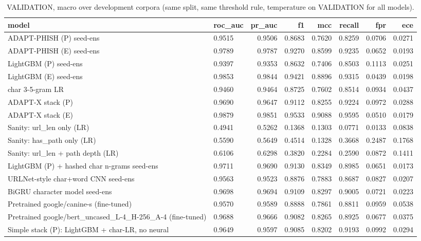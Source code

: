 \begin{table}[t]
\centering
\scriptsize
\caption{VALIDATION, macro over development corpora (same split, same threshold rule, temperature on VALIDATION for all models).}
\label{tab:baselines}
\begin{tabular}{llrrrrrr}
\toprule
model & roc\_auc & pr\_auc & f1 & mcc & recall & fpr & ece \\
\midrule
ADAPT-PHISH (P) seed-ens & 0.9515 & 0.9506 & 0.8683 & 0.7620 & 0.8259 & 0.0706 & 0.0271 \\
ADAPT-PHISH (E) seed-ens & 0.9789 & 0.9787 & 0.9270 & 0.8599 & 0.9235 & 0.0652 & 0.0193 \\
LightGBM (P) seed-ens & 0.9397 & 0.9353 & 0.8632 & 0.7406 & 0.8503 & 0.1113 & 0.0251 \\
LightGBM (E) seed-ens & 0.9853 & 0.9844 & 0.9421 & 0.8896 & 0.9315 & 0.0439 & 0.0198 \\
char 3-5-gram LR & 0.9460 & 0.9464 & 0.8725 & 0.7602 & 0.8514 & 0.0934 & 0.0437 \\
ADAPT-X stack (P) & 0.9690 & 0.9647 & 0.9112 & 0.8255 & 0.9224 & 0.0972 & 0.0288 \\
ADAPT-X stack (E) & 0.9879 & 0.9851 & 0.9533 & 0.9088 & 0.9595 & 0.0510 & 0.0179 \\
Sanity: url\_len only (LR) & 0.4941 & 0.5262 & 0.1368 & 0.1303 & 0.0771 & 0.0133 & 0.0838 \\
Sanity: has\_path only (LR) & 0.5590 & 0.5649 & 0.4514 & 0.1328 & 0.3668 & 0.2487 & 0.1768 \\
Sanity: url\_len + path depth (LR) & 0.6106 & 0.6298 & 0.3820 & 0.2284 & 0.2590 & 0.0872 & 0.1411 \\
LightGBM (P) + hashed char n-grams seed-ens & 0.9711 & 0.9690 & 0.9130 & 0.8349 & 0.8985 & 0.0651 & 0.0173 \\
URLNet-style char+word CNN seed-ens & 0.9563 & 0.9523 & 0.8876 & 0.7883 & 0.8687 & 0.0827 & 0.0207 \\
BiGRU character model seed-ens & 0.9698 & 0.9694 & 0.9109 & 0.8297 & 0.9005 & 0.0721 & 0.0223 \\
Pretrained google/canine-s (fine-tuned) & 0.9570 & 0.9589 & 0.8888 & 0.7861 & 0.8811 & 0.0959 & 0.0538 \\
Pretrained google/bert\_uncased\_L-4\_H-256\_A-4 (fine-tuned) & 0.9688 & 0.9666 & 0.9082 & 0.8265 & 0.8925 & 0.0677 & 0.0375 \\
Simple stack (P): LightGBM + char-LR, no neural & 0.9649 & 0.9597 & 0.9085 & 0.8202 & 0.9193 & 0.0992 & 0.0294 \\

\end{tabular}
\end{table}
